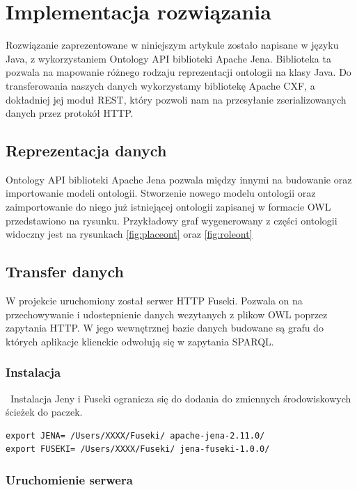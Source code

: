 \section{Implementacja rozwiązania}
\label{cha:impl}

Rozwiązanie zaprezentowane w niniejszym artykule zostało napisane w języku Java, z wykorzystaniem Ontology API biblioteki Apache Jena. Biblioteka ta pozwala na mapowanie różnego rodzaju reprezentacji ontologii na klasy Java. Do transferowania naszych danych wykorzystamy bibliotekę Apache CXF, a dokładniej jej moduł REST, który pozwoli nam na przesyłanie zserializowanych danych przez protokół HTTP.

\subsection{Reprezentacja danych}
\label{sec:persist}

Ontology API biblioteki Apache Jena pozwala między innymi na budowanie oraz importowanie modeli ontologii. Stworzenie nowego modelu ontologii oraz zaimportowanie do niego już istniejącej ontologii zapisanej w formacie OWL przedstawiono na rysunku. Przykładowy graf wygenerowany z części ontologii widoczny jest na rysunkach \ref{fig:placeont} oraz \ref{fig:roleont}

\subsection{Transfer danych}
\label{sec:transfer}

W projekcie uruchomiony został serwer HTTP Fuseki. Pozwala on na przechowywanie i udostepnienie danych wczytanych z plikow OWL poprzez zapytania HTTP. W jego wewnętrznej bazie danych budowane są grafu do których aplikacje klienckie odwołują się w zapytania SPARQL.

\subsubsection{Instalacja}

~Instalacja Jeny i Fuseki ogranicza się do dodania do zmiennych środowiskowych ścieżek do paczek.
\begin{lstlisting}
export JENA= /Users/XXXX/Fuseki/ apache-jena-2.11.0/
export FUSEKI= /Users/XXXX/Fuseki/ jena-fuseki-1.0.0/
\end{lstlisting}

\subsubsection{Uruchomienie serwera}

